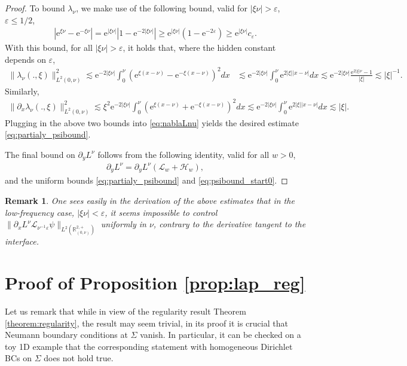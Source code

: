 \documentclass[report]{elsarticle}
\newtheorem{remark}[theorem]{Remark}
\numberwithin{theorem}{section}
\newcommand{\re}{\varepsilon}
\begin{document}
\begin{proof}
To bound $\lambda_{\nu}$, we make use of the following bound, valid for $|\xi\nu|>\varepsilon$, $\varepsilon\leq 1/2$, 
\begin{align}
	\label{eq:c}
	|\mathrm{e}^{\xi\nu}-\mathrm{e}^{-\xi\nu}|=\mathrm{e}^{|\xi\nu|}|1-\mathrm{e}^{-2|\xi\nu|}|\geq \mathrm{e}^{|\xi\nu|}(1-\mathrm{e}^{-2\re})\geq \mathrm{e}^{|\xi\nu|}c_{\re}.
\end{align}
With this bound, for all $|\xi\nu|>\varepsilon$, it holds that, where the hidden constant depends on $\re$, 
\begin{align*}
\|\lambda_{\nu}(.,\xi)\|^2_{L^2(0,\nu)}\lesssim \mathrm{e}^{-2|\xi\nu|}\int_0^{\nu}(\mathrm{e}^{\xi(x-\nu)}-\mathrm{e}^{-\xi(x-\nu)})^2dx
&\lesssim  \mathrm{e}^{-2|\xi\nu|}\int_0^{\nu}\mathrm{e}^{2|\xi||x-\nu|}dx\lesssim \mathrm{e}^{-2|\xi\nu|}\frac{\mathrm{e}^{2|\xi|\nu}-1}{|\xi|}\lesssim |\xi|^{-1}.
\end{align*}
Similarly, 
\begin{align*}
	\|\partial_x \lambda_{\nu}(.,\xi)\|^2_{L^2(0,\nu)}\lesssim \xi^2\mathrm{e}^{-2|\xi\nu|}\int_0^{\nu}(\mathrm{e}^{\xi(x-\nu)}+\mathrm{e}^{-\xi(x-\nu)})^2dx\lesssim \mathrm{e}^{-2|\xi\nu|}\int_0^{\nu}\mathrm{e}^{2|\xi||x-\nu|}dx\lesssim |\xi|.
\end{align*}
Plugging in the above two bounds into \eqref{eq:nablaLnu} yields the desired estimate \eqref{eq:partialy_psibound}.

The final bound on $\partial_y L^{\nu}$ follows from the following identity, valid for all $w>0$,
\begin{align*}
	\partial_y L^{\nu}=\partial_y L^{\nu}(\mathcal{L}_w+\mathcal{H}_w),
\end{align*}
and the uniform bounds \eqref{eq:partialy_psibound} and \eqref{eq:psibound_start0}.
\end{proof}
\begin{remark}
	One sees easily in the derivation of the above estimates that in the low-frequency case, $|\xi\nu|<\re$, it seems impossible to control $\|\partial_x L^{\nu}\mathcal{L}_{\nu^{-1}\re}\psi\|_{L^2(\mathbb{R}^{2,+}_{(0,\nu)})}$ uniformly in $\nu$, contrary to the derivative tangent to the interface. 
\end{remark}

\section{Proof of Proposition \ref{prop:lap_reg} }
\label{appendix:lap_auxiliary}
Let us remark that while in view of the regularity result Theorem \ref{theorem:regularity}, the result may seem trivial, in its proof it is crucial that Neumann boundary conditions at $\Sigma$ vanish. In particular, it can be checked on a toy 1D example that the corresponding statement with homogeneous Dirichlet BCs on $\Sigma$ does not hold true. 
\end{document}
